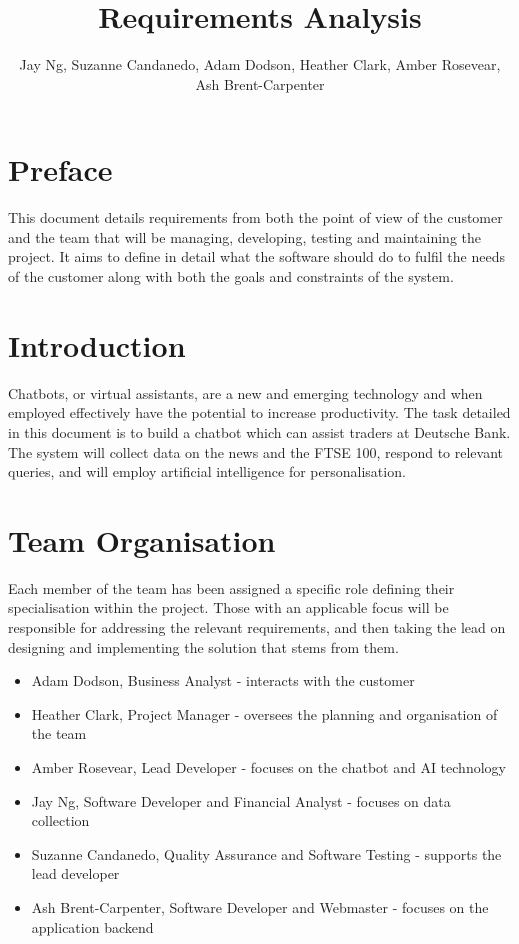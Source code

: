\documentclass{IEEEtran}
\title{Requirements Analysis}
\author{Jay Ng, Suzanne Candanedo, Adam Dodson, Heather Clark, Amber Rosevear, Ash Brent-Carpenter}
\begin{document}
	\onecolumn

	\maketitle
	\section{Preface}
	This document details requirements from both the point of view of the customer and the team that will be managing, developing, testing and maintaining the project. It aims to define in detail what the software should do to fulfil the needs of the customer along with both the goals and constraints of the system.  
	
	\section{Introduction}
	Chatbots, or virtual assistants, are a new and emerging technology and when employed effectively have the potential to increase productivity. The task detailed in this document is to build a chatbot which can assist traders at Deutsche Bank. The system will collect data on the news and the FTSE 100, respond to relevant queries, and will employ artificial intelligence for personalisation.  
	
	\section{Team Organisation}
	Each member of the team has been assigned a specific role defining their specialisation within the project. Those with an applicable focus will be responsible for addressing the relevant requirements, and then taking the lead on designing and implementing the solution that stems from them.  

	\begin{itemize}
	\item Adam Dodson, Business Analyst - interacts with the customer 
	\item Heather Clark, Project Manager - oversees the planning and organisation of the team 
	\item Amber Rosevear, Lead Developer - focuses on the chatbot and AI technology
	\item Jay Ng, Software Developer and Financial Analyst - focuses on data collection
	\item Suzanne Candanedo, Quality Assurance and Software Testing - supports the lead developer
	\item Ash Brent-Carpenter, Software Developer and Webmaster - focuses on the application backend
	\end{itemize}
	
\end{document}
